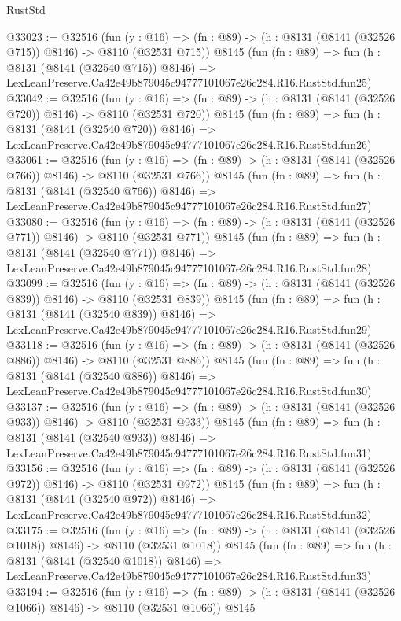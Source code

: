 \begin{lexlean}{RustStd}
\begin{coremodule}
@33023 := @32516
    (fun (y : @16) => (fn : @89) -> (h : @8131 (@8141 (@32526 @715)) @8146) -> @8110 (@32531 @715))
    @8145
    (fun (fn : @89) =>
    fun (h : @8131 (@8141 (@32540 @715)) @8146) =>
    LexLeanPreserve.Ca42e49b879045c94777101067e26c284.R16.RustStd.fun25)
@33042 := @32516
    (fun (y : @16) => (fn : @89) -> (h : @8131 (@8141 (@32526 @720)) @8146) -> @8110 (@32531 @720))
    @8145
    (fun (fn : @89) =>
    fun (h : @8131 (@8141 (@32540 @720)) @8146) =>
    LexLeanPreserve.Ca42e49b879045c94777101067e26c284.R16.RustStd.fun26)
@33061 := @32516
    (fun (y : @16) => (fn : @89) -> (h : @8131 (@8141 (@32526 @766)) @8146) -> @8110 (@32531 @766))
    @8145
    (fun (fn : @89) =>
    fun (h : @8131 (@8141 (@32540 @766)) @8146) =>
    LexLeanPreserve.Ca42e49b879045c94777101067e26c284.R16.RustStd.fun27)
@33080 := @32516
    (fun (y : @16) => (fn : @89) -> (h : @8131 (@8141 (@32526 @771)) @8146) -> @8110 (@32531 @771))
    @8145
    (fun (fn : @89) =>
    fun (h : @8131 (@8141 (@32540 @771)) @8146) =>
    LexLeanPreserve.Ca42e49b879045c94777101067e26c284.R16.RustStd.fun28)
@33099 := @32516
    (fun (y : @16) => (fn : @89) -> (h : @8131 (@8141 (@32526 @839)) @8146) -> @8110 (@32531 @839))
    @8145
    (fun (fn : @89) =>
    fun (h : @8131 (@8141 (@32540 @839)) @8146) =>
    LexLeanPreserve.Ca42e49b879045c94777101067e26c284.R16.RustStd.fun29)
@33118 := @32516
    (fun (y : @16) => (fn : @89) -> (h : @8131 (@8141 (@32526 @886)) @8146) -> @8110 (@32531 @886))
    @8145
    (fun (fn : @89) =>
    fun (h : @8131 (@8141 (@32540 @886)) @8146) =>
    LexLeanPreserve.Ca42e49b879045c94777101067e26c284.R16.RustStd.fun30)
@33137 := @32516
    (fun (y : @16) => (fn : @89) -> (h : @8131 (@8141 (@32526 @933)) @8146) -> @8110 (@32531 @933))
    @8145
    (fun (fn : @89) =>
    fun (h : @8131 (@8141 (@32540 @933)) @8146) =>
    LexLeanPreserve.Ca42e49b879045c94777101067e26c284.R16.RustStd.fun31)
@33156 := @32516
    (fun (y : @16) => (fn : @89) -> (h : @8131 (@8141 (@32526 @972)) @8146) -> @8110 (@32531 @972))
    @8145
    (fun (fn : @89) =>
    fun (h : @8131 (@8141 (@32540 @972)) @8146) =>
    LexLeanPreserve.Ca42e49b879045c94777101067e26c284.R16.RustStd.fun32)
@33175 := @32516
    (fun (y : @16) =>
    (fn : @89) -> (h : @8131 (@8141 (@32526 @1018)) @8146) -> @8110 (@32531 @1018))
    @8145
    (fun (fn : @89) =>
    fun (h : @8131 (@8141 (@32540 @1018)) @8146) =>
    LexLeanPreserve.Ca42e49b879045c94777101067e26c284.R16.RustStd.fun33)
@33194 := @32516
    (fun (y : @16) =>
    (fn : @89) -> (h : @8131 (@8141 (@32526 @1066)) @8146) -> @8110 (@32531 @1066))
    @8145

\end{coremodule}
\end{lexlean}
